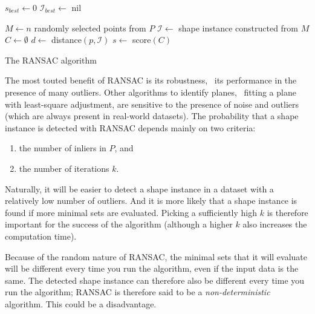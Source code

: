 \begin{algorithm}
	$s_{best} \leftarrow 0$\;
	$\mathcal{I}_{best} \leftarrow$ nil\;

	{
		$M \leftarrow n$ randomly selected points from $P$\;
		$\mathcal{I} \leftarrow$ shape instance constructed from $M$\;
		$C \leftarrow \emptyset$ \;
		{
			$d \leftarrow$ distance$(p,\mathcal{I})$\;
		}
		$s \leftarrow$ score$(C)$\;
	}
	\caption{The RANSAC algorithm}
	\label{algo:ransac}
\end{algorithm}




The most touted benefit of RANSAC is its robustness, \ie\ its performance in the presence of many outliers. 
Other algorithms to identify planes, \eg\ fitting a plane with least-square adjustment, are sensitive to the presence of noise and outliers (which are always present in real-world datasets).
The probability that a shape instance is detected with RANSAC depends mainly on two criteria:
\begin{enumerate}
	\item the number of inliers in $P$, and
	\item the number of iterations $k$.
\end{enumerate}
Naturally, it will be easier to detect a shape instance in a dataset with a relatively low number of outliers.
And it is more likely that a shape instance is found if more minimal sets are evaluated.
Picking a sufficiently high $k$ is therefore important for the success of the algorithm (although a higher $k$ also increases the computation time).

Because of the random nature of RANSAC, the minimal sets that it will evaluate will be different every time you run the algorithm, even if the input data is the same.
The detected shape instance can therefore also be different every time you run the algorithm; RANSAC is therefore said to be a \emph{non-deterministic} algorithm.
This could be a disadvantage.

